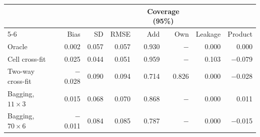 \begin{tabular}{lrrrrrrr}
\toprule
 & \multicolumn{3}{c}{} & \multicolumn{2}{c}{Coverage (95\%)} & \multicolumn{2}{c}{} \\ \cmidrule(lr){5-6}
 & Bias & SD & RMSE & Add & Own & Leakage & Product \\
\midrule
Oracle & 0.002 & 0.057 & 0.057 & 0.930 & $-$ & 0.000 & 0.000 \\
Cell cross-fit & 0.025 & 0.044 & 0.051 & 0.959 & $-$ & 0.103 & $-$0.079 \\
Two-way cross-fit & $-$0.028 & 0.090 & 0.094 & 0.714 & 0.826 & 0.000 & $-$0.028 \\
Bagging, $11\times3$ & 0.015 & 0.068 & 0.070 & 0.868 & $-$ & 0.000 & 0.011 \\
Bagging, $70\times6$ & $-$0.011 & 0.084 & 0.085 & 0.787 & $-$ & 0.000 & $-$0.015 \\
\bottomrule
\end{tabular}
